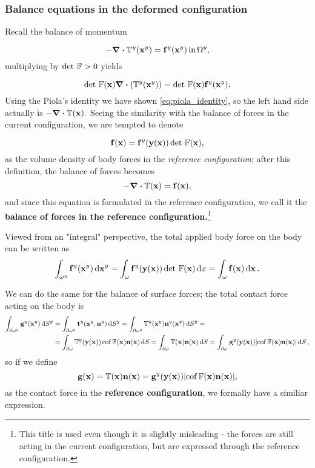 \documentclass[11pt]{scrartcl} %
\begin{document}
\subsubsection{Balance equations in the deformed configuration}
\label{sec:balance_equations_piola}
Recall the balance of momentum

\begin{equation*}
    -\divergence{\cstress\qty(\vb{x}^{y})}=\vb{f}^{y}\qty(\vb{x}^{y}) \, \text{in} \, \Omega^{y},
\end{equation*}
multiplying by $\det\, \mathbb{F} >0$ yields

\begin{equation*}
    \detf\qty(\vb{x}) \divergence{\qty(\cstress\qty(\vb{x}^{y}))} = \detf \qty(\vb{x}) \vb{f}^{y}\qty(\vb{x}^{y}).
\end{equation*}
Using the Piola's identity we have shown \ref{eq:piola_identity}, so the left hand side actually is $-\divergence{\pkstress\qty(\vb{x})}.$ Seeing the similarity with the balance of forces in the current configuration, we are tempted to denote

\begin{equation*}
    \vb{f}\qty(\vb{x})= \vb{f}^{y}\qty(\vb{y}\qty(\vb{x})) \det\, \mathbb{F} \qty(\vb{x}) ,
\end{equation*}
as the volume density of body forces in the \textit{reference configuration}; after this definition, the balance of forces becomes
\[
	-\divergence{\pkstress\qty(\vb{x})} = \vb{f}\qty(\vb{x}),
\]
and since this equation is formulated in the reference configuration, we call it the \textbf{balance of forces in the reference configuration.}\footnote{This title is used even though it is slightly misleading - the forces are still acting in the current configuration, but are expressed through the reference configuration.}

Viewed from an "integral" perspective, the total applied body force on the body can be written as
\[
	\int_{\omega^{y}}\vb{f}^{y}\qty(\vb{x}^{y})\dd{\vb{x}^{y}} = \int_{\omega}\vb{f}^{y}\qty(\vb{y}\qty(\vb{x}))\det\, \mathbb{F} \qty(\vb{x})\dd{x} = \int_{\omega}\vb{f}\qty(\vb{x})\dd{\vb{x}}.
\]

We can do the same for the balance of surface forces; the total contact force acting on the body is
\begin{align*}
	\int_{\partial \omega^{y}}\vb{g}^{y}\qty(\vb{x}^{y})\dd{S}^{y} &=\int_{\partial \omega^{y}}\vb{t}^{y}\qty(\vb{x}^{y},\vb{n}^{y})\dd{S}^{y} = \int_{\partial \omega^{y}}\mathbb{T}^y\qty(\vb{x}^{y})\vb{n}^{y}\qty(\vb{x}^{y})\dd{S}^{y}=\\
								&=\int_{\partial \omega}\mathbb{T}^y(\vb{y}(\vb{x}))\operatorname{cof} \mathbb{F}(\vb{x}) \vb{n}\qty(\vb{x})\dd{S} = \int_{\partial \omega}\mathbb{T}\qty(\vb{x})\vb{n}\qty(\vb{x})\dd{S}= \int_{\partial \omega}\vb{g}^{y}\qty(\vb{y}\qty(\vb{x}))\abs{\operatorname{cof} \mathbb{F}\qty(\vb{x}) \vb{n}\qty(\vb{x})}\dd{S},
\end{align*}
so if we define
\[
	\vb{g}(\vb{x}) = \mathbb{T}\qty(\vb{x})\vb{n}\qty(\vb{x}) = \vb{g}^{y}\qty(\vb{y}\qty(\vb{x}))\abs{\operatorname{cof} \mathbb{F}(\vb{x}) \vb{n}\qty(\vb{x})},
\]
as the contact force in the \textbf{reference configuration}, we formally have a similiar expression.
\end{document}
